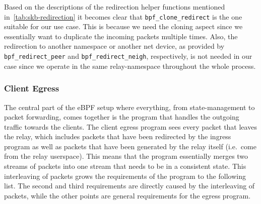 Based on the descriptions of the redirection helper functions mentioned in~\autoref{tab:skb-redirection}
it becomes clear that \verb|bpf_clone_redirect| is the one suitable for our use case. 
This is because we need the cloning aspect since we essentially want to duplicate the incoming packets multiple times.
Also, the redirection to another namespace or another net device, as provided by \verb|bpf_redirect_peer| and
\verb|bpf_redirect_neigh|, respectively, is not needed in our case since we operate in the same relay-namespace
throughout the whole process.

\subsubsection{Client Egress}\label{sec:client-egress}
The central part of the eBPF setup where everything, from state-management to packet forwarding, 
comes together is the program that handles the outgoing traffic towards the clients.
The client egress program sees every packet that leaves the relay, which includes packets that have 
been redirected by the ingress program as well as packets that have been generated by the relay itself
(i.e.~come from the relay userspace).
This means that the program essentially merges two streams of packets into one stream that needs to 
be in a consistent state.
This interleaving of packets grows the requirements of the program to the following list.
The second and third requirements are directly caused by the interleaving of packets, while the other points are
general requirements for the egress program.
